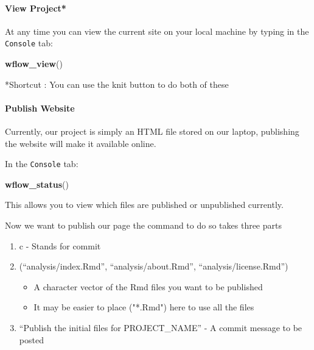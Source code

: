 \documentclass[openany]{article}
\newenvironment{Shaded}{\begin{snugshade}}{\end{snugshade}}
\newcommand{\KeywordTok}[1]{\textcolor[rgb]{0.13,0.29,0.53}{\textbf{#1}}}
\newcommand{\NormalTok}[1]{#1}
\providecommand{\tightlist}{%
  \setlength{\itemsep}{0pt}\setlength{\parskip}{0pt}}
\let\oldparagraph\paragraph
\renewcommand{\paragraph}[1]{\oldparagraph{#1}\mbox{}}
\begin{document}
\hypertarget{view-project}{%
\paragraph{View Project*}\label{view-project}}

At any time you can view the current site on your local machine by typing in the \texttt{Console} tab:

\begin{Shaded}
\begin{Highlighting}[]
\KeywordTok{wflow_view}\NormalTok{()}
\end{Highlighting}
\end{Shaded}

*Shortcut : You can use the knit button to do both of these

\hypertarget{publish-website}{%
\paragraph{Publish Website}\label{publish-website}}

Currently, our project is simply an HTML file stored on our laptop, publishing the website will make it available online.

In the \texttt{Console} tab:

\begin{Shaded}
\begin{Highlighting}[]
\KeywordTok{wflow_status}\NormalTok{()}
\end{Highlighting}
\end{Shaded}

This allows you to view which files are published or unpublished currently.

Now we want to publish our page the command to do so takes three parts

\begin{enumerate}
\def\labelenumi{\arabic{enumi}.}
\tightlist
\item
  c - Stands for commit
\item
  (``analysis/index.Rmd'', ``analysis/about.Rmd'', ``analysis/license.Rmd'')

  \begin{itemize}
  \tightlist
  \item
    A character vector of the Rmd files you want to be published
  \item
    It may be easier to place ("*.Rmd") here to use all the files
  \end{itemize}
\item
  ``Publish the initial files for PROJECT\_NAME'' - A commit message to be posted
\end{enumerate}
\end{document}
